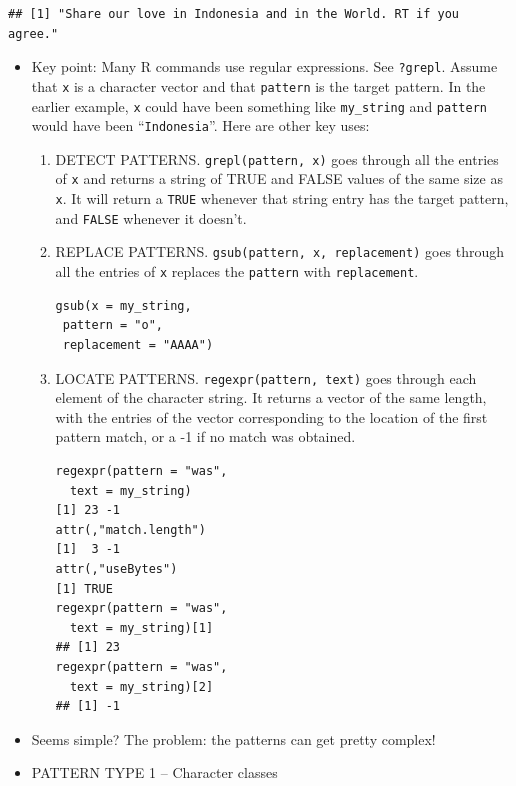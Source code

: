\documentclass[]{book}
\theoremstyle{definition}
\theoremstyle{definition}
\theoremstyle{definition}
\theoremstyle{remark}
\begin{document}
\begin{verbatim}
## [1] "Share our love in Indonesia and in the World. RT if you agree."
\end{verbatim}

\begin{itemize}
\item
  Key point: Many R commands use regular expressions. See
  \texttt{?grepl}. Assume that \texttt{x} is a character vector and that
  \texttt{pattern} is the target pattern. In the earlier example,
  \texttt{x} could have been something like \texttt{my\_string} and
  \texttt{pattern} would have been ``\texttt{Indonesia}''. Here are
  other key uses:

  \begin{enumerate}
  \def\labelenumi{\arabic{enumi}.}
  \item
    DETECT PATTERNS. \texttt{grepl(pattern,\ x)} goes through all the
    entries of \texttt{x} and returns a string of TRUE and FALSE values
    of the same size as \texttt{x}. It will return a \texttt{TRUE}
    whenever that string entry has the target pattern, and
    \texttt{FALSE} whenever it doesn't.
  \item
    REPLACE PATTERNS. \texttt{gsub(pattern,\ x,\ replacement)} goes
    through all the entries of \texttt{x} replaces the \texttt{pattern}
    with \texttt{replacement}.

\begin{verbatim}
gsub(x = my_string,
 pattern = "o", 
 replacement = "AAAA")
\end{verbatim}
  \item
    LOCATE PATTERNS. \texttt{regexpr(pattern,\ text)} goes through each
    element of the character string. It returns a vector of the same
    length, with the entries of the vector corresponding to the location
    of the first pattern match, or a -1 if no match was obtained.

\begin{verbatim}
regexpr(pattern = "was", 
  text = my_string)
[1] 23 -1
attr(,"match.length")
[1]  3 -1
attr(,"useBytes")
[1] TRUE
regexpr(pattern = "was",
  text = my_string)[1]
## [1] 23
regexpr(pattern = "was", 
  text = my_string)[2]
## [1] -1
\end{verbatim}
  \end{enumerate}
\item
  Seems simple? The problem: the patterns can get pretty complex!
\item
  PATTERN TYPE 1 -- Character classes
\end{itemize}
\end{document}

